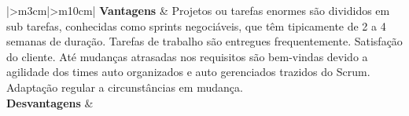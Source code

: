 \begin{longtable}{{|>{\centering\arraybackslash}m{3cm}|>{\centering\arraybackslash}m{10cm}|}}
\textbf{Vantagens}                                          & Projetos ou
tarefas enormes são divididos em sub tarefas, conhecidas como sprints
negociáveis, que têm tipicamente de 2 a 4 semanas de duração. Tarefas de
trabalho são entregues frequentemente. Satisfação do cliente. Até mudanças
atrasadas nos requisitos são bem-vindas devido a agilidade dos times auto
organizados e auto gerenciados trazidos do Scrum. Adaptação regular a
circunstâncias em mudança. \\ \hline \textbf{Desvantagens}                                       &                                                                                                                                                                                                                                                                                                                                                                                                           \\ \hline

\end{longtable}



